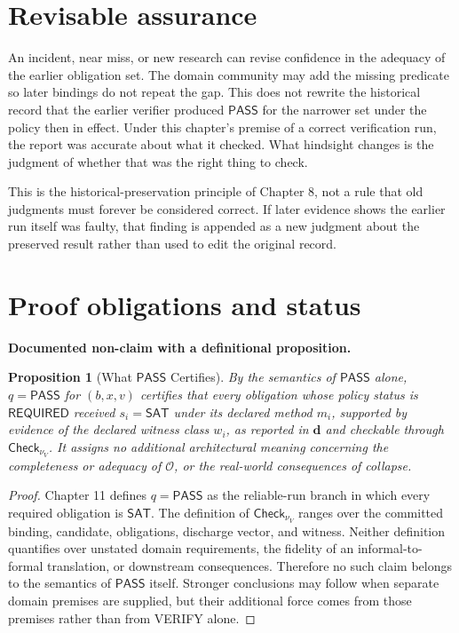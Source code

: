 \documentclass[11pt,openany]{book}
\newtheorem{proposition}[definition]{Proposition}
\newcommand{\Pass}{\mathsf{PASS}}
\newcommand{\Required}{\mathsf{REQUIRED}}
\begin{document}
\section{Revisable assurance}

An incident, near miss, or new research can revise confidence in the adequacy
of the earlier obligation set. The domain community may add the missing
predicate so later bindings do not repeat the gap. This does not rewrite the
historical record that the earlier verifier produced \(\Pass\) for the narrower
set under the policy then in effect. Under this chapter's premise of a correct
verification run, the report was accurate about what it checked. What hindsight
changes is the judgment of whether that was the right thing to check.

This is the historical-preservation principle of Chapter 8, not a rule that
old judgments must forever be considered correct. If later evidence shows the
earlier run itself was faulty, that finding is appended as a new judgment about
the preserved result rather than used to edit the original record.

\section{Proof obligations and status}

\textbf{Documented non-claim with a definitional proposition.}

\begin{proposition}[What \texorpdfstring{\(\Pass\)}{PASS} Certifies]
By the semantics of \(\Pass\) alone, \(q=\Pass\) for \((b,x,v)\) certifies
that every obligation whose policy status is \(\Required\) received
\(s_i=\mathsf{SAT}\) under its declared method \(m_i\), supported by evidence
of the declared witness class \(w_i\), as reported in \(\mathbf d\) and
checkable through \(\mathsf{Check}_{\nu_V}\). It assigns no additional
architectural meaning concerning the completeness or adequacy of
\(\mathcal O\), or the real-world consequences of collapse.
\end{proposition}

\begin{proof}
Chapter 11 defines \(q=\Pass\) as the reliable-run branch in which every
required obligation is \(\mathsf{SAT}\). The definition of
\(\mathsf{Check}_{\nu_V}\) ranges over the committed binding, candidate,
obligations, discharge vector, and witness. Neither definition quantifies over
unstated domain requirements, the fidelity of an informal-to-formal
translation, or downstream consequences. Therefore no such claim belongs to
the semantics of \(\Pass\) itself. Stronger conclusions may follow when
separate domain premises are supplied, but their additional force comes from
those premises rather than from VERIFY alone.
\end{proof}
\end{document}
